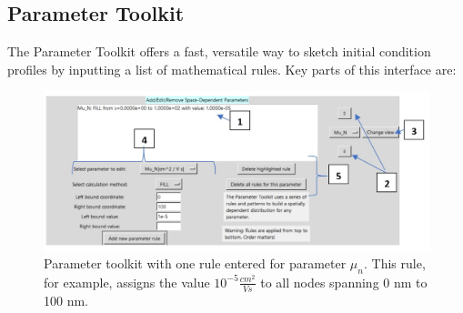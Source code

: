 \documentclass[11pt,letterpaper,titlepage]{article}
\begin{document}
			\subsection{Parameter Toolkit}
			\par The Parameter Toolkit offers a fast, versatile way to sketch initial condition profiles by inputting a list of mathematical rules. Key parts of this interface are: 
			\begin{figure}[H]
				\label{fig:param_toolkit}
				\centering
				\includegraphics[scale=0.5]{"param_toolkit"}
				\caption{Parameter toolkit with one rule entered for parameter $\mu_{n}$. This rule, for example, assigns the value $10^{-5} \frac{cm^{2}}{V s}$ to all nodes spanning 0 nm to 100 nm.}
			\end{figure}
\end{document}

